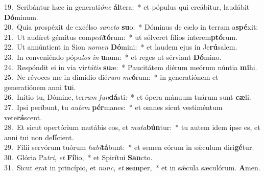 {19.~}Scribántur hæc in generati\textit{ó}\textit{ne} \textbf{ál}tera:~* et pópulus qui creábitur, laudábit \textbf{Dó}minum.\\
{20.~}Quia prospéxit de excélso \textit{san}\textit{cto} \textbf{su}o:~* Dóminus de cælo in terram a\textbf{spé}xit:\\
{21.~}Ut audíret gémitus com\textit{pe}\textit{di}\textbf{tó}rum:~* ut sólveret fílios interem\textbf{ptó}rum.\\
{22.~}Ut annúntient in Sion \textit{no}\textit{men} \textbf{Dó}mini:~* et laudem ejus in Je\textbf{rú}salem.\\
{23.~}In conveniéndo pópu\textit{los} \textit{in} \textbf{u}num:~* et reges ut sérviant \textbf{Dó}mino.\\
{24.~}Respóndit ei in via vir\textit{tú}\textit{tis} \textbf{su}æ:~* Paucitátem diérum meórum núntia \textbf{mi}hi.\\
{25.~}Ne révoces me in dimídio dié\textit{rum} \textit{me}\textbf{ó}rum:~* in generatiónem et generatiónem anni \textbf{tu}i.\\
{26.~}Inítio tu, Dómine, ter\textit{ram} \textit{fun}\textbf{dá}sti:~* et ópera mánuum tuárum sunt \textbf{cæ}li.\\
{27.~}Ipsi períbunt, tu \textit{au}\textit{tem} \textbf{pér}manes:~* et omnes sicut vestiméntum vete\textbf{rá}scent.\\
{28.~}Et sicut opertórium mutábis eos, et \textit{mu}\textit{ta}\textbf{bún}tur:~* tu autem idem ipse es, et anni tui non de\textbf{fí}cient.\\
{29.~}Fílii servórum tuórum \textit{ha}\textit{bi}\textbf{tá}bunt:~* et semen eórum in sǽculum diri\textbf{gé}tur.\\
{30.~}Glória Pa\textit{tri}, \textit{et} \textbf{Fí}lio,~* et Spirítui \textbf{San}cto.\\
{31.~}Sicut erat in princípio, et \textit{nunc}, \textit{et} \textbf{sem}per,~* et in sǽcula sæculórum. \textbf{A}men.\\
